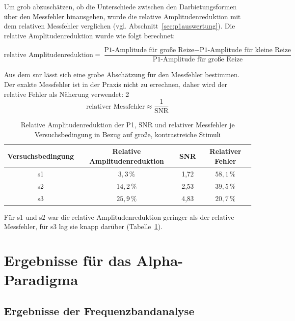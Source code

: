 Um grob abzuschätzen, ob die Unterschiede zwischen den Darbietungsformen über den Messfehler hinausgehen, wurde die relative Amplitudenreduktion mit dem relativen Messfehler verglichen (vgl. Abschnitt~\ref{sec:p1auswertung}). Die relative Amplitudenreduktion wurde wie folgt berechnet:

\begin{equation} \text{relative Amplitudenreduktion} = \frac{\text{P1-Amplitude für große Reize} - \text{P1-Amplitude für kleine Reize}}{\text{P1-Amplitude für große Reize}}
\end{equation}

Aus dem \acrshort{snr} lässt sich eine grobe Abschätzung für den Messfehler bestimmen. Der exakte Messfehler ist in der Praxis nicht zu errechnen, daher wird der relative Fehler als Näherung verwendet:
2
\begin{equation}
    \text{relativer Messfehler} \approx \frac{1}{\text{SNR}}
\end{equation}

\begin{table}[htbp]
    \centering
    \caption{Relative Amplitudenreduktion der P1, SNR und relativer Messfehler je Versuchsbedingung in Bezug auf große, kontrastreiche Stimuli}
    \label{tab:p1_reduktion}
    \begin{tabular}{cccc}
    \toprule
    Versuchsbedingung & Relative Amplitudenreduktion & SNR & Relativer Fehler \\
    \midrule
    s1 & $3{,}3\,\%$  & 1,72 & $58{,}1\,\%$ \\
    s2 & $14{,}2\,\%$ & 2,53 & $39{,}5\,\%$  \\
    s3 & $25{,}9\,\%$ & 4,83 & $20{,}7\,\%$  \\
    \bottomrule
    \end{tabular}
\end{table}

Für s1 und s2 war die relative Amplitudenreduktion geringer als der relative Messfehler, für s3 lag sie knapp darüber (Tabelle~\ref{tab:p1_reduktion}).

\section{Ergebnisse für das Alpha-Paradigma}

\subsection{Ergebnisse der Frequenzbandanalyse}
\label{sec:frequenzbandanalyse}


